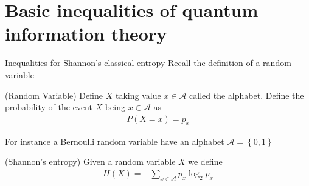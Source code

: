 \section{Basic inequalities of quantum information theory}

\begin{parag}{Inequalities for Shannon's classical entropy}
    Recall the definition of a random variable
	\begin{definition}{(Random Variable)}
	Define $X$ taking value $x \in \mathcal{A}$ called the alphabet. Define the probability of the event $X$ being $x \in \mathcal{A}$ as 
	\begin{align*} 
		P\left(X = x\right) = p_x 
	\end{align*}
	\end{definition}
	For instance a Bernoulli random variable have an alphabet $\mathcal{A} = \left\{0, 1\right\}$
	\begin{definition}{(Shannon's entropy)}
	Given a random variable $X$ we define 
	\begin{align*} 
		H\left(X\right) = - \sum_{x \in \mathcal{A}}p_x \log_2 p_x
	\end{align*}
	\end{definition}
\end{parag}

